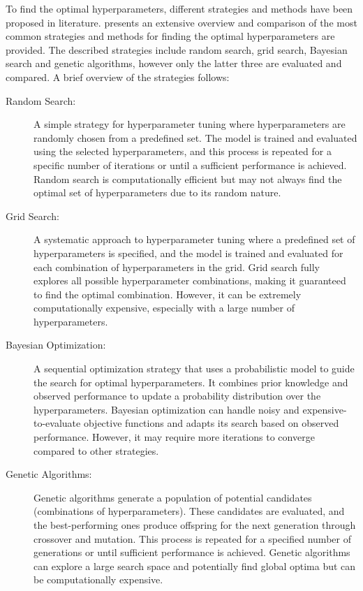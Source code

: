 To find the optimal hyperparameters, different strategies and methods have been proposed in literature. 
\textcite{genetic-algorithms} presents an extensive overview and comparison of the most common strategies and methods for finding the optimal hyperparameters are provided. The described strategies include random search, grid search, Bayesian search and genetic algorithms, however only the latter three are evaluated and compared. A brief overview of the strategies follows:

\begin{description}
	\item[Random Search:] A simple strategy for hyperparameter tuning where hyperparameters are randomly chosen from a predefined set. The model is trained and evaluated using the selected hyperparameters, and this process is repeated for a specific number of iterations or until a sufficient performance is achieved. Random search is computationally efficient but may not always find the optimal set of hyperparameters due to its random nature.
	\item[Grid Search:] A systematic approach to hyperparameter tuning where a predefined set of hyperparameters is specified, and the model is trained and evaluated for each combination of hyperparameters in the grid. Grid search fully explores all possible hyperparameter combinations, making it guaranteed to find the optimal combination. However, it can be extremely computationally expensive, especially with a large number of hyperparameters.
	\item[Bayesian Optimization:] A sequential optimization strategy that uses a probabilistic model to guide the search for optimal hyperparameters. It combines prior knowledge and observed performance to update a probability distribution over the hyperparameters. Bayesian optimization can handle noisy and expensive-to-evaluate objective functions and adapts its search based on observed performance. However, it may require more iterations to converge compared to other strategies.
	\item[Genetic Algorithms:] Genetic algorithms generate a population of potential candidates (combinations of hyperparameters). These candidates are evaluated, and the best-performing ones produce offspring for the next generation through crossover and mutation. This process is repeated for a specified number of generations or until sufficient performance is achieved. Genetic algorithms can explore a large search space and potentially find global optima but can be computationally expensive.
\end{description}

